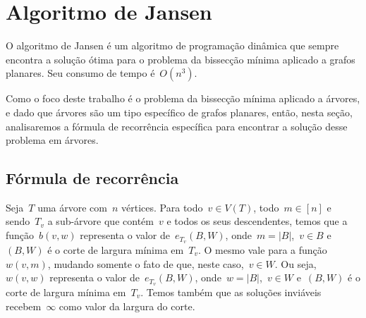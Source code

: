 \section {Algoritmo de Jansen}

O algoritmo de Jansen é um algoritmo de 
programação dinâmica que sempre encontra
a solução ótima para o problema da bissecção
mínima aplicado a grafos planares.
Seu consumo de tempo é~$O(n^3)$.

Como o foco deste trabalho é o problema da 
bissecção mínima aplicado a árvores, e dado
que árvores são um tipo específico de grafos
planares, então, nesta seção, analisaremos a 
fórmula de recorrência específica para encontrar
a solução desse problema em árvores. 

\bigskip
\bigskip

\subsection*{Fórmula de recorrência}

Seja~$T$ uma árvore com~$n$ vértices. 
Para todo~${v\in V(T)}$, todo~${m\in[n]}$
e sendo~$T_v$ a sub-árvore que contém~$v$
e todos os seus descendentes,
temos que a função~$b(v,w)$ representa o valor
de~$e_{T_v}(B,W)$, onde~${m=|B|}$,~${v\in B}$
e~$(B,W)$ é o corte de largura mínima em~$T_v$.
O mesmo vale para a função~$w(v,m)$, mudando somente
o fato de que, neste caso,~${v\in W}$.
Ou seja,~$w(v,w)$ representa o valor
de~$e_{T_v}(B,W)$, onde~${w=|B|}$,~${v\in W}$
e~$(B,W)$ é o corte de largura mínima em~$T_v$.
Temos também que as soluções inviáveis recebem~$\infty$
como valor da largura do corte.

